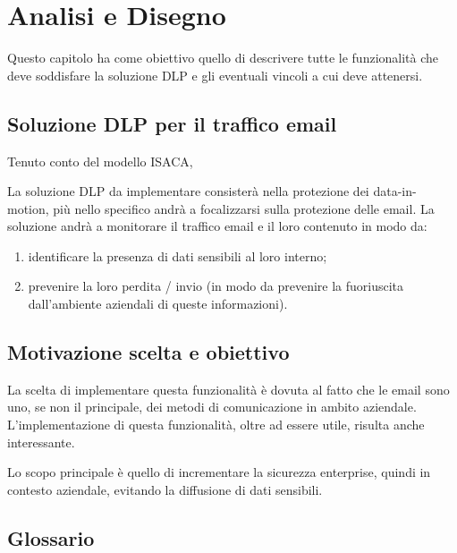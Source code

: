 \chapter{Analisi e Disegno}


Questo capitolo ha come obiettivo quello di descrivere tutte le funzionalità che deve soddisfare la 
soluzione DLP e gli eventuali vincoli a cui deve attenersi.

\section{Soluzione DLP per il traffico email}
Tenuto conto del modello ISACA,

La soluzione DLP da implementare consisterà nella protezione dei data-in-motion, più nello specifico
andrà a focalizzarsi sulla protezione delle email. La soluzione andrà a monitorare il traffico email e
il loro contenuto in modo da:

\begin{enumerate}
    \item {identificare la presenza di dati sensibili al loro interno;}
    \item {prevenire la loro perdita / 
    invio (in modo da prevenire la fuoriuscita dall’ambiente aziendali di queste informazioni).}
\end{enumerate}

\section{Motivazione scelta e obiettivo}
La scelta di implementare questa funzionalità è dovuta al fatto che le email sono uno, 
se non il principale, dei metodi di comunicazione in ambito aziendale.
L’implementazione di questa funzionalità, oltre ad essere utile, risulta anche interessante.

Lo scopo principale è quello di incrementare la sicurezza enterprise, quindi in contesto aziendale, 
evitando la diffusione di dati sensibili.

\pagebreak
\section{Glossario}

